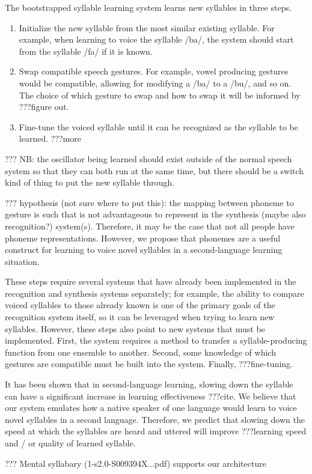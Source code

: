 The bootstrapped syllable learning system
learns new syllables in three steps.

\begin{enumerate}
\item Initialize the new syllable from the most
  similar existing syllable.
  For example, when learning to voice
  the syllable /ba/, the system should
  start from the syllable /fa/ if it is known.
\item Swap compatible speech gestures.
  For example, vowel producing gestures
  would be compatible, allowing for modifying
  a /ba/ to a /bu/, and so on.
  The choice of which gesture to swap and
  how to swap it will be informed by
  ???figure out.
\item Fine-tune the voiced syllable
  until it can be recognized as the
  syllable to be learned.
  ???more
\end{enumerate}

??? NB: the oscillator being learned should exist outside of
the normal speech system so that they can both run
at the same time, but there should be a switch kind of thing
to put the new syllable through.

??? hypothesis (not sure where to put this):
the mapping between phoneme to gesture
is such that is not advantageous
to represent in the synthesis
(maybe also recognition?) system(s).
Therefore, it may be the case that
not all people have phoneme representations.
However, we propose that phonemes
are a useful construct for learning to voice
novel syllables in a second-language learning situation.

These steps require several systems
that have already been implemented
in the recognition and synthesis systems separately;
for example, the ability to compare
voiced syllables to those already known
is one of the primary goals of the recognition system itself,
so it can be leveraged when trying to learn new syllables.
However, these steps also point to new systems
that must be implemented.
First, the system requires a method
to transfer a syllable-producing function
from one ensemble to another.
Second, some knowledge of which gestures
are compatible must be built into the system.
Finally, ???fine-tuning.

It has been shown that in second-language learning,
slowing down the syllable can have
a significant increase in learning effectiveness
???cite.
We believe that our system emulates
how a native speaker of one language
would learn to voice novel syllables in a second language.
Therefore, we predict that slowing down
the speed at which the syllables are heard
and uttered will improve ???learning speed
and / or quality of learned syllable.

??? Mental syllabary (1-s2.0-S009394X...pdf)
supports our architecture

